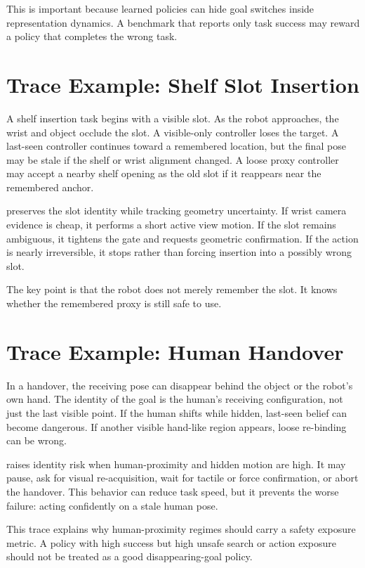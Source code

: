 This is important because learned policies can hide goal switches inside representation dynamics. A benchmark that reports only task success may reward a policy that completes the wrong task.

\section{Trace Example: Shelf Slot Insertion}

A shelf insertion task begins with a visible slot. As the robot approaches, the wrist and object occlude the slot. A visible-only controller loses the target. A last-seen controller continues toward a remembered location, but the final pose may be stale if the shelf or wrist alignment changed. A loose proxy controller may accept a nearby shelf opening as the old slot if it reappears near the remembered anchor.

\method preserves the slot identity while tracking geometry uncertainty. If wrist camera evidence is cheap, it performs a short active view motion. If the slot remains ambiguous, it tightens the gate and requests geometric confirmation. If the action is nearly irreversible, it stops rather than forcing insertion into a possibly wrong slot.

The key point is that the robot does not merely remember the slot. It knows whether the remembered proxy is still safe to use.

\section{Trace Example: Human Handover}

In a handover, the receiving pose can disappear behind the object or the robot's own hand. The identity of the goal is the human's receiving configuration, not just the last visible point. If the human shifts while hidden, last-seen belief can become dangerous. If another visible hand-like region appears, loose re-binding can be wrong.

\method raises identity risk when human-proximity and hidden motion are high. It may pause, ask for visual re-acquisition, wait for tactile or force confirmation, or abort the handover. This behavior can reduce task speed, but it prevents the worse failure: acting confidently on a stale human pose.

This trace explains why human-proximity regimes should carry a safety exposure metric. A policy with high success but high unsafe search or action exposure should not be treated as a good disappearing-goal policy.

